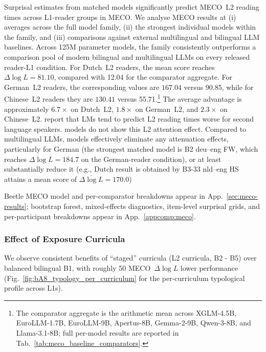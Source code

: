 Surprisal estimates from matched \beetle{} models significantly predict MECO~L2 reading times across L1-reader groups in MECO. We analyse \beetle{} MECO results at (i) averages across the full \beetle{} model family, (ii) the strongest individual models within the \beetle{} family, and (iii) comparisons against external multilingual and bilingual LLM baselines.  Across \beetle{} 125M parameter models, the \beetle{} family consistently outperforms a comparison pool of modern bilingual and multilingual LLMs on every released reader-L1 condition. For Dutch~L2 readers, the mean \beetle{} score reaches $\Delta\log L = \mathbf{81.10}$, compared with 12.04 for the comparator aggregate. For German~L2 readers, the corresponding values are $\mathbf{167.04}$ versus 90.85, while for Chinese~L2 readers they are $\mathbf{130.41}$ versus 55.71.\footnote{The comparator aggregate is the arithmetic mean across XGLM-4.5B, EuroLLM-1.7B, EuroLLM-9B, Apertus-8B, Gemma-2-9B, Qwen-3-8B, and Llama-3.1-8B; full per-model results are reported in Tab.~\ref{tab:meco_baseline_comparators}.} The average \beetle{} advantage is approximately $6.7\times$ on Dutch~L2, $1.8\times$ on German~L2, and $2.3\times$ on Chinese~L2. \citet{de-varda-marelli-2022-effects} report that LMs tend to predict L2 reading times worse for second language speakers. \beetle{} models do not show this L2 attention effect. Compared to  multilingual LLMs, \beetle models effectively eliminate any attenuation effects, particularly for German (the strongest matched model is B2 deu--eng FW, which reaches $\Delta\log L = 184.7$ on the German-reader condition), or at least substantially reduce it (e.g., Dutch result is obtained by B3-33 nld--eng HS attains a mean score of $\overline{\Delta\log L}=170.0$)


Beetle MECO model and per-comparator breakdowns appear in App.~\ref{sec:meco-results}; bootstrap forest, mixed-effects diagnostics, item-level surprisal grids, and per-participant breakdowns appear in App.~\ref{appcomp:meco}.


\subsubsection{Effect of \beetle{} Exposure Curricula}

We observe consistent benefits of “staged” curricula (L2 curricula, B2 - B5) over balanced bilingual B1, with roughly 50 MECO~$\Delta\log L$ lower performance (Fig.~\ref{fig:bA8_typology_per_curriculum} for the per-curriculum typological profile across L1s). 

